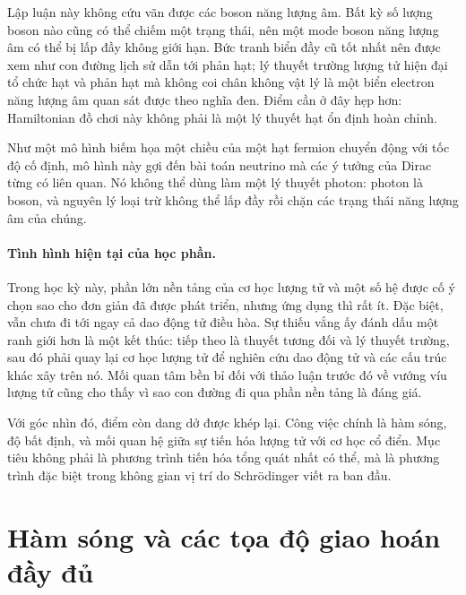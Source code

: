 Lập luận này không cứu vãn được các boson năng lượng âm. Bất kỳ số lượng boson nào cũng có thể chiếm một trạng thái, nên một mode boson năng lượng âm có thể bị lấp đầy không giới hạn. Bức tranh biển đầy cũ tốt nhất nên được xem như con đường lịch sử dẫn tới phản hạt; lý thuyết trường lượng tử hiện đại tổ chức hạt và phản hạt mà không coi chân không vật lý là một biển electron năng lượng âm quan sát được theo nghĩa đen. Điểm cần ở đây hẹp hơn: Hamiltonian đồ chơi này không phải là một lý thuyết hạt ổn định hoàn chỉnh.

Như một mô hình biếm họa một chiều của một hạt fermion chuyển động với tốc độ cố định, mô hình này gợi đến bài toán neutrino mà các ý tưởng của Dirac từng có liên quan. Nó không thể dùng làm một lý thuyết photon: photon là boson, và nguyên lý loại trừ không thể lấp đầy rồi chặn các trạng thái năng lượng âm của chúng.

\begin{classroomqa}
\end{classroomqa}

\paragraph{Tình hình hiện tại của học phần.}
Trong học kỳ này, phần lớn nền tảng của cơ học lượng tử và một số hệ được cố ý chọn sao cho đơn giản đã được phát triển, nhưng ứng dụng thì rất ít. Đặc biệt, vẫn chưa đi tới ngay cả dao động tử điều hòa. Sự thiếu vắng ấy đánh dấu một ranh giới hơn là một kết thúc: tiếp theo là thuyết tương đối và lý thuyết trường, sau đó phải quay lại cơ học lượng tử để nghiên cứu dao động tử và các cấu trúc khác xây trên nó. Mối quan tâm bền bỉ đối với thảo luận trước đó về vướng víu lượng tử cũng cho thấy vì sao con đường đi qua phần nền tảng là đáng giá.

Với góc nhìn đó, điểm còn dang dở được khép lại. Công việc chính là hàm sóng, độ bất định, và mối quan hệ giữa sự tiến hóa lượng tử với cơ học cổ điển. Mục tiêu không phải là phương trình tiến hóa tổng quát nhất có thể, mà là phương trình đặc biệt trong không gian vị trí do Schr\"odinger viết ra ban đầu.

\section{Hàm sóng và các tọa độ giao hoán đầy đủ}

